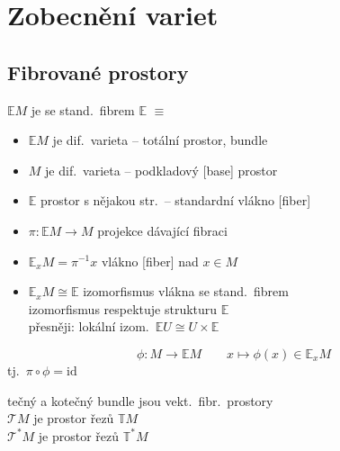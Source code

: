 \section{Zobecnění variet}

\newpage
{}
\subsection{Fibrované prostory}

\begin{definice}
$\mathbb{E}M$ je  se stand.\ fibrem $\mathbb{E}$ $\equiv$
\begin{itemize}[nosep]
  \item[] $\mathbb{E}M$ je dif.\ varieta \hfill -- totální prostor, bundle
  \item[] $M$ je dif.\ varieta \hfill -- podkladový [base] prostor
  \item[] $\mathbb{E}$ prostor s nějakou str.\ \hfill -- standardní vlákno [fiber]
  \item[] $\pi:\mathbb{E}M\to M$ \quad projekce dávající fibraci
  \item[] $\mathbb{E}_xM = \pi^{-1}x$ \quad vlákno [fiber] nad $x\in M$
  \item[] $\mathbb{E}_xM\cong\mathbb{E}$ \quad izomorfismus vlákna se stand.\ fibrem \\
          izomorfismus respektuje strukturu $\mathbb{E}$ \\
          přesněji: lokální izom.\ \quad $\mathbb{E}U\cong U\times\mathbb{E}$
\end{itemize}
\end{definice}

\begin{definice}
\[
  \phi: M\to\mathbb{E}M \qquad x\mapsto\phi(x)\in\mathbb{E}_xM
\]
tj.\ \quad $\pi\circ\phi = \mathrm{id}$
\end{definice}

tečný a kotečný bundle jsou vekt.\ fibr.\ prostory \\
\quad $\mathcal{T}M$ je prostor řezů $\mathbb{T}M$ \\
\quad $\mathcal{T}^*M$ je prostor řezů $\mathbb{T}^*M$

